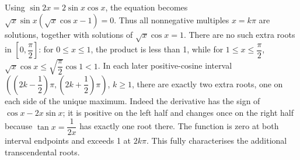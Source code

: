 Using $\sin2x=2\sin x\cos x$, the equation becomes $\sqrt x\sin x(\sqrt x\cos x-1)=0$. Thus all nonnegative multiples $x=k\pi$ are solutions, together with solutions of $\sqrt x\cos x=1$. There are no such extra roots in $[0 , \dfrac{\pi}{2}]$: for $0\le x\le1$, the product is less than 1, while for $1 \le x \le \dfrac{\pi}{2}$, $\sqrt{x} \cos x \le \sqrt{\dfrac{\pi}{2}} \cos 1 < 1$. In each later positive-cosine interval $((2 k - \dfrac{1}{2}) \pi , (2 k + \dfrac{1}{2}) \pi)$, $k\ge1$, there are exactly two extra roots, one on each side of the unique maximum. Indeed the derivative has the sign of $\cos x-2x\sin x$; it is positive on the left half and changes once on the right half because $\tan x = \dfrac{1}{2x}$ has exactly one root there. The function is zero at both interval endpoints and exceeds 1 at $2k\pi$. This fully characterises the additional transcendental roots.
